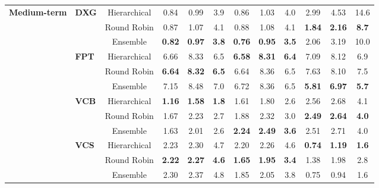 \begin{table}[!h]
\begin{tabular}{llcccc|ccc|ccc}
\multirow{12}{*}{\textbf{Medium-term}}
& \multirow{3}{*}{\textbf{DXG}} & Hierarchical & 0.84 & 0.99 & 3.9 & 0.86 & 1.03 & 4.0 & 2.99 & 4.53 & 14.6 \\
& & Round Robin & 0.87 & 1.07 & 4.1 & 0.88 & 1.08 & 4.1 & \textbf{1.84} & \textbf{2.16} & \textbf{8.7} \\
& & Ensemble & \textbf{0.82} & \textbf{0.97} & \textbf{3.8} & \textbf{0.76} & \textbf{0.95} & \textbf{3.5} & 2.06 & 3.19 & 10.0 \\
& \multirow{3}{*}{\textbf{FPT}} & Hierarchical & 6.66 & 8.33 & 6.5 & \textbf{6.58} & \textbf{8.31} & \textbf{6.4} & 7.09 & 8.12 & 6.9 \\
& & Round Robin & \textbf{6.64} & \textbf{8.32} & \textbf{6.5} & 6.64 & 8.36 & 6.5 & 7.63 & 8.10 & 7.5 \\
& & Ensemble & 7.15 & 8.48 & 7.0 & 6.72 & 8.36 & 6.5 & \textbf{5.81} & \textbf{6.97} & \textbf{5.7} \\
& \multirow{3}{*}{\textbf{VCB}} & Hierarchical & \textbf{1.16} & \textbf{1.58} & \textbf{1.8} & 1.61 & 1.80 & 2.6 & 2.56 & 2.68 & 4.1 \\
& & Round Robin & 1.67 & 2.23 & 2.7 & 1.88 & 2.32 & 3.0 & \textbf{2.49} & \textbf{2.64} & \textbf{4.0} \\
& & Ensemble & 1.63 & 2.01 & 2.6 & \textbf{2.24} & \textbf{2.49} & \textbf{3.6} & 2.51 & 2.71 & 4.0 \\
& \multirow{3}{*}{\textbf{VCS}} & Hierarchical & 2.23 & 2.30 & 4.7 & 2.20 & 2.26 & 4.6 & \textbf{0.74} & \textbf{1.19} & \textbf{1.6} \\
& & Round Robin & \textbf{2.22} & \textbf{2.27} & \textbf{4.6} & \textbf{1.65} & \textbf{1.95} & \textbf{3.4} & 1.38 & 1.98 & 2.8 \\
& & Ensemble & 2.30 & 2.37 & 4.8 & 1.85 & 2.05 & 3.8 & 0.75 & 0.94 & 1.6 \\
\midrule


\end{tabular}
\end{table}
